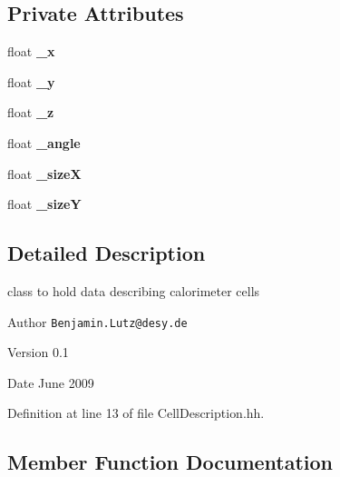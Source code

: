 \subsection*{Private Attributes}
\begin{DoxyCompactItemize}
\item 
float {\bfseries \_\-x}\label{classCALICE_1_1CellDescription_a7fb41b8afeb9685ae79637ec5468d553}

\item 
float {\bfseries \_\-y}\label{classCALICE_1_1CellDescription_a26ec9fdc2f9c3f378174e9ac230ab8ea}

\item 
float {\bfseries \_\-z}\label{classCALICE_1_1CellDescription_ac47492d24aa6e1a1f690ede7ec761f90}

\item 
float {\bfseries \_\-angle}\label{classCALICE_1_1CellDescription_ae7ec071cb586209c1a875aeaf9668832}

\item 
float {\bfseries \_\-sizeX}\label{classCALICE_1_1CellDescription_ae44c3d85f32117dff76664abfcf0c670}

\item 
float {\bfseries \_\-sizeY}\label{classCALICE_1_1CellDescription_acd70a2b79f5fc53f0b5c422cab9ae337}

\end{DoxyCompactItemize}


\subsection{Detailed Description}
class to hold data describing calorimeter cells \begin{DoxyAuthor}{Author}
{\tt Benjamin.Lutz@desy.de} 
\end{DoxyAuthor}
\begin{DoxyVersion}{Version}
0.1 
\end{DoxyVersion}
\begin{DoxyDate}{Date}
June 2009 
\end{DoxyDate}


Definition at line 13 of file CellDescription.hh.

\subsection{Member Function Documentation}
